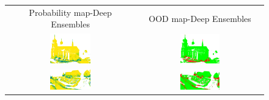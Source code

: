         \begin{figure}[h!]
            \centering
            \begin{tabular}{cc}
                Probability map-Deep Ensembles & OOD map-Deep Ensembles \\
                \includegraphics[width=0.33\textwidth, height=0.18\textheight]{images/ood_imgs/de_sem3d/de_prob_10_1.png}& 
                \includegraphics[width=0.33\textwidth, height=0.18\textheight]{images/ood_imgs/de_sem3d/de_ood_auroc_1.png}\\
    
                \includegraphics[width=0.33\textwidth, height=0.18\textheight]{images/ood_imgs/de_sem3d/de_prob_10_2.png}& 
                \includegraphics[width=0.33\textwidth, height=0.18\textheight]{images/ood_imgs/de_sem3d/de_ood_auroc_2.png}\\
    

\end{tabular}
\end{figure}
